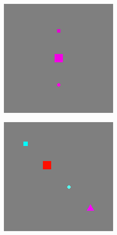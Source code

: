 \begin{figure}
\begin{subfigure}{.21\textwidth}
	\caption{}%
\end{subfigure}
\hfill
\begin{subfigure}{.21\textwidth}
\includegraphics[width=\textwidth]{imgs/cem/KANDY_2-T24-pos.png}
\caption{}%
\end{subfigure}
\begin{subfigure}{.21\textwidth}
\includegraphics[width=\textwidth]{imgs/cem/KANDY_2-T24-neg.png}

\end{subfigure}
\end{figure}
